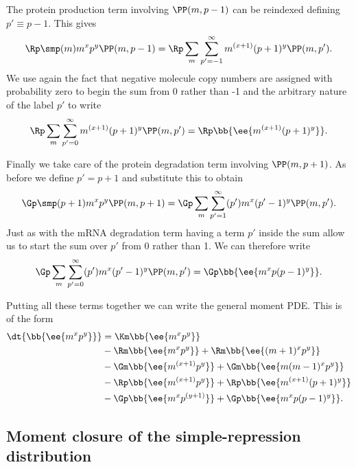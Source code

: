 The protein production term involving $\PP(m, p - 1)$ can be reindexed defining
$p' \equiv p - 1$. This gives
\begin{equation}
  \Rp \smp (m) m^x p^y \PP(m, p - 1) =
  \Rp \sum_m \sum_{p'=-1}^\infty m^{(x + 1)} (p + 1)^y \PP(m, p').
\end{equation}
We use again the fact that negative molecule copy numbers are assigned with
probability zero to begin the sum from 0 rather than -1 and the arbitrary nature
of the label $p'$ to write
\begin{equation}
  \Rp \sum_m \sum_{p'=0}^\infty m^{(x + 1)} (p + 1)^y \PP(m, p') =
  \Rp \bb{\ee{m^{(x + 1)} (p + 1)^y}}.
\end{equation}

Finally we take care of the protein degradation term involving $\PP(m, p + 1)$.
As before we define $p' = p + 1$ and substitute this to obtain
\begin{equation}
  \Gp \smp (p + 1) m^x p^y \PP(m, p + 1) =
  \Gp \sum_m \sum_{p'=1}^\infty (p') m^x (p' - 1)^y \PP(m, p').
\end{equation}
Just as with the mRNA degradation term having a term $p'$  inside the sum allow
us to start the sum over $p'$ from 0 rather than 1. We can therefore write
\begin{equation}
  \Gp \sum_m \sum_{p'=0}^\infty (p') m^x (p' - 1)^y \PP(m, p') =
  \Gp \bb{\ee{m^x p (p - 1)^y}}.
\end{equation}

Putting all these terms together we can write the general moment PDE. This is
of the form
\begin{equation}
  \begin{aligned}
    \dt{\bb{\ee{m^x p^y}}} &=
    \Km \bb{\ee{m^x p^y}}\\
    &- \Rm \bb{\ee{m^x p^y}} + \Rm \bb{\ee{(m+1)^x p^y}}\\
    &- \Gm \bb{\ee{m^{(x + 1)} p^y}} + \Gm \bb{\ee{m (m - 1)^x p^y}}\\
    &- \Rp \bb{\ee{m^{(x + 1)} p^y}} + \Rp \bb{\ee{m^{(x + 1)} (p + 1)^y}}\\
    &- \Gp \bb{\ee{m^x p^{(y + 1)}}} + \Gp \bb{\ee{m^x p (p - 1)^y}}.
  \end{aligned}
  \label{eq_mom_pde}
\end{equation}

\subsection{Moment closure of the simple-repression distribution}

